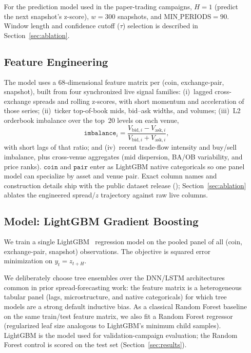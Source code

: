 For the prediction model used in the paper-trading campaigns, $H = 1$ (predict the next snapshot's z-score), $w = 300$ snapshots, and $\text{MIN\_PERIODS} = 90$. Window length and confidence cutoff ($\tau$) selection is described in Section~\ref{sec:ablation}.

\subsection{Feature Engineering}\label{sec:features}

The model uses a 68-dimensional feature matrix per (coin, exchange-pair, snapshot), built from four synchronized live signal families: (i)~lagged cross-exchange spreads and rolling z-scores, with short momentum and acceleration of those series; (ii)~ticker top-of-book mids, bid--ask widths, and volumes; (iii)~L2 orderbook imbalance over the top~20 levels on each venue,
\begin{equation}
    \texttt{imbalance}_i = \frac{V_{\text{bid},i} - V_{\text{ask},i}}{V_{\text{bid},i} + V_{\text{ask},i}},
\end{equation}
with short lags of that ratio; and (iv)~recent trade-flow intensity and buy/sell imbalance, plus cross-venue aggregates (mid dispersion, BA/OB variability, and price ranks). $\texttt{coin}$ and $\texttt{pair}$ enter as LightGBM native categoricals so one panel model can specialize by asset and venue pair. Exact column names and construction details ship with the public dataset release (\datasetref); Section~\ref{sec:ablation} ablates the engineered spread/$z$ trajectory against raw live columns.

\subsection{Model: LightGBM Gradient Boosting}\label{sec:lgbm}

We train a single LightGBM~\cite{ke2017lightgbm} regression model on the pooled panel of all (coin, exchange-pair, snapshot) observations. The objective is squared error minimization on $y_t = z_{t+H}$.

We deliberately choose tree ensembles over the DNN/LSTM architectures common in prior spread-forecasting work: the feature matrix is a heterogeneous tabular panel (lags, microstructure, and native categoricals) for which tree models are a strong default inductive bias. As a classical Random Forest baseline on the same train/test feature matrix, we also fit a Random Forest regressor~\cite{breiman2001random} (regularized leaf size analogous to LightGBM's minimum child samples). LightGBM is the model used for validation-campaign evaluation; the Random Forest control is scored on the test set (Section~\ref{sec:results}).

